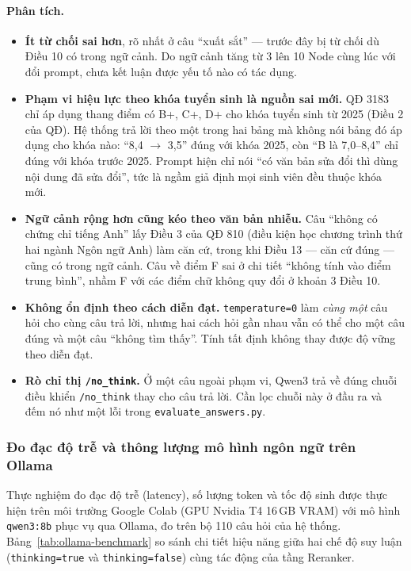 \paragraph{Phân tích.}
\begin{itemize}
  \item \textbf{Ít từ chối sai hơn}, rõ nhất ở câu ``xuất sắt'' --- trước đây bị từ chối dù Điều 10 có
        trong ngữ cảnh. Do ngữ cảnh tăng từ 3 lên 10 Node cùng lúc với đổi prompt, chưa kết luận được
        yếu tố nào có tác dụng.
  \item \textbf{Phạm vi hiệu lực theo khóa tuyển sinh là nguồn sai mới.} QĐ 3183 chỉ áp dụng thang điểm
        có B+, C+, D+ cho khóa tuyển sinh từ 2025 (Điều 2 của QĐ). Hệ thống trả lời theo một trong hai
        bảng mà không nói bảng đó áp dụng cho khóa nào: ``8,4 $\to$ 3,5'' đúng với khóa 2025, còn ``B là
        7,0--8,4'' chỉ đúng với khóa trước 2025. Prompt hiện chỉ nói ``có văn bản sửa đổi thì dùng nội
        dung đã sửa đổi'', tức là ngầm giả định mọi sinh viên đều thuộc khóa mới.
  \item \textbf{Ngữ cảnh rộng hơn cũng kéo theo văn bản nhiễu.} Câu ``không có chứng chỉ tiếng Anh'' lấy
        Điều 3 của QĐ 810 (điều kiện học chương trình thứ hai ngành Ngôn ngữ Anh) làm căn cứ, trong khi
        Điều 13 --- căn cứ đúng --- cũng có trong ngữ cảnh. Câu về điểm F sai ở chi tiết ``không tính vào
        điểm trung bình'', nhầm F với các điểm chữ không quy đổi ở khoản 3 Điều 10.
  \item \textbf{Không ổn định theo cách diễn đạt.} \texttt{temperature=0} làm \emph{cùng một} câu hỏi cho
        cùng câu trả lời, nhưng hai cách hỏi gần nhau vẫn có thể cho một câu đúng và một câu ``không tìm
        thấy''. Tính tất định không thay được độ vững theo diễn đạt.
  \item \textbf{Rò chỉ thị \texttt{/no\_think}.} Ở một câu ngoài phạm vi, Qwen3 trả về đúng chuỗi điều khiển
        \texttt{/no\_think} thay cho câu trả lời. Cần lọc chuỗi này ở đầu ra và đếm nó như một lỗi trong
        \texttt{evaluate\_answers.py}.
\end{itemize}

\subsubsection{Đo đạc độ trễ và thông lượng mô hình ngôn ngữ trên Ollama}
\label{sec:ollama-benchmark}

Thực nghiệm đo đạc độ trễ (latency), số lượng token và tốc độ sinh được thực hiện trên môi trường Google Colab (GPU Nvidia T4 16\,GB VRAM) với mô hình \texttt{qwen3:8b} phục vụ qua Ollama, đo trên bộ 110 câu hỏi của hệ thống. Bảng~\ref{tab:ollama-benchmark} so sánh chi tiết hiệu năng giữa hai chế độ suy luận (\texttt{thinking=true} và \texttt{thinking=false}) cùng tác động của tầng Reranker.

